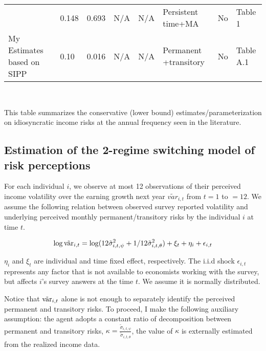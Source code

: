 \begin{sidewaystable}[p]
\begin{adjustbox}{width={\textwidth}}
\begin{threeparttable}
\begin{tabular}{llllllll}
\cite{bayer2019precautionary}    & 0.148          & 0.693           & N/A           & N/A          & Persistent time+MA      & No           & Table 1   \\
My Estimates based on SIPP       & 0.10           & 0.016           & N/A           & N/A          & Permanent +transitory   & No           & Table A.1
\end{tabular} \\
\hline 
	\begin{flushleft}
\item This table summarizes the  conservative (lower bound) estimates/parameterization on idiosyncratic income risks at the annual frequency seen in the literature.    \end{flushleft}
\end{threeparttable}
\end{adjustbox}
	\end{sidewaystable}

\subsection{Estimation of the 2-regime switching model of risk perceptions}
\label{appendix:markov}

For each individual $i$, we observe at most 12 observations of their perceived income volatility over the earning growth next year $\tilde {var}_{i,t}$ from $t=1$ to $=12$. We assume the following relation between observed survey reported volatility and underlying perceived monthly permanent/transitory risks by the individual $i$ at time $t$.  


$$\log \tilde {\text{var}}_{i,t}= \log(12 \tilde \sigma^2_{i,t,\psi} + 1/12 \tilde \sigma^2_{i,t,\theta})+\xi_{t}+\eta_{i}+\epsilon_{i,t}$$

$\eta_i$ and $\xi_t$ are individual and time fixed effect, respectively. The i.i.d shock $\epsilon_{i,t}$ represents any factor that is not available to economists working with the survey, but affects $i$'s survey answers at the time $t$. We assume it is normally distributed.

Notice that $\tilde {\text{var}}_{i,t}$ alone is not enough to separately identify the perceived permanent and transitory risks. To proceed, I make the following auxiliary assumption: the agent adopts a constant ratio of decomposition between permanent and transitory risks, $\kappa =\frac{\tilde \sigma_{i,t,\psi}}{\tilde \sigma_{i,t,\theta}}$, the value of $\kappa$ is externally estimated from the realized income data. 

